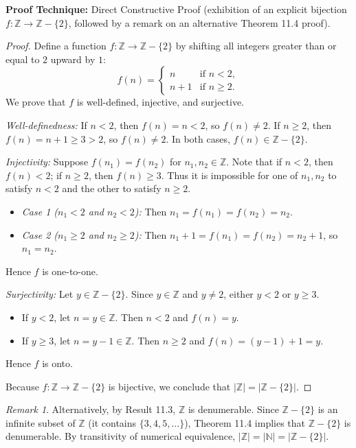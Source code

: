 \documentclass[11pt, letterpaper]{article}
\theoremstyle{definition}
\theoremstyle{remark}
\newtheorem{remark}{Remark}[section]
\begin{document}
\textbf{Proof Technique:} Direct Constructive Proof (exhibition of an explicit bijection $f : \mathbb{Z} \to \mathbb{Z} - \{2\}$, followed by a remark on an alternative Theorem 11.4 proof).

\begin{proof}
Define a function $f : \mathbb{Z} \to \mathbb{Z} - \{2\}$ by shifting all integers greater than or equal to $2$ upward by $1$:
\[
f(n) = \begin{cases}
n & \text{if } n < 2, \\[4pt]
n + 1 & \text{if } n \ge 2.
\end{cases}
\]
We prove that $f$ is well-defined, injective, and surjective.

\emph{Well-definedness:} If $n < 2$, then $f(n) = n < 2$, so $f(n) \neq 2$. If $n \ge 2$, then $f(n) = n + 1 \ge 3 > 2$, so $f(n) \neq 2$. In both cases, $f(n) \in \mathbb{Z} - \{2\}$.

\emph{Injectivity:} Suppose $f(n_1) = f(n_2)$ for $n_1, n_2 \in \mathbb{Z}$. Note that if $n < 2$, then $f(n) < 2$; if $n \ge 2$, then $f(n) \ge 3$. Thus it is impossible for one of $n_1, n_2$ to satisfy $n < 2$ and the other to satisfy $n \ge 2$.
\begin{itemize}
    \item \emph{Case 1 ($n_1 < 2$ and $n_2 < 2$):} Then $n_1 = f(n_1) = f(n_2) = n_2$.
    \item \emph{Case 2 ($n_1 \ge 2$ and $n_2 \ge 2$):} Then $n_1 + 1 = f(n_1) = f(n_2) = n_2 + 1$, so $n_1 = n_2$.
\end{itemize}
Hence $f$ is one-to-one.

\emph{Surjectivity:} Let $y \in \mathbb{Z} - \{2\}$. Since $y \in \mathbb{Z}$ and $y \neq 2$, either $y < 2$ or $y \ge 3$.
\begin{itemize}
    \item If $y < 2$, let $n = y \in \mathbb{Z}$. Then $n < 2$ and $f(n) = y$.
    \item If $y \ge 3$, let $n = y - 1 \in \mathbb{Z}$. Then $n \ge 2$ and $f(n) = (y - 1) + 1 = y$.
\end{itemize}
Hence $f$ is onto.

Because $f : \mathbb{Z} \to \mathbb{Z} - \{2\}$ is bijective, we conclude that $|\mathbb{Z}| = |\mathbb{Z} - \{2\}|$.
\end{proof}

\begin{remark}
Alternatively, by Result 11.3, $\mathbb{Z}$ is denumerable. Since $\mathbb{Z} - \{2\}$ is an infinite subset of $\mathbb{Z}$ (it contains $\{3, 4, 5, \dots\}$), Theorem 11.4 implies that $\mathbb{Z} - \{2\}$ is denumerable. By transitivity of numerical equivalence, $|\mathbb{Z}| = |\mathbb{N}| = |\mathbb{Z} - \{2\}|$.
\end{remark}
\end{document}
